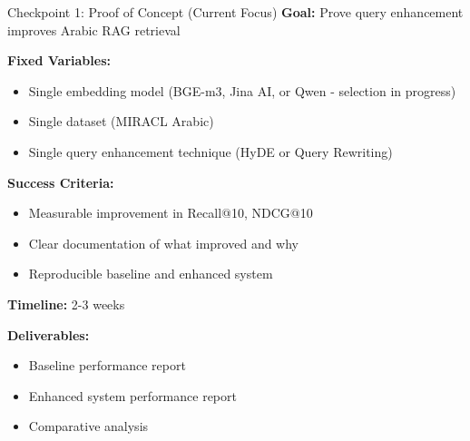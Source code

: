 \documentclass[aspectratio=169]{beamer}
\begin{document}
\begin{frame}{Checkpoint 1: Proof of Concept (Current Focus)}
\textbf{Goal:} Prove query enhancement improves Arabic RAG retrieval

\vspace{0.3cm}

\textbf{Fixed Variables:}
\begin{itemize}
    \item Single embedding model (BGE-m3, Jina AI, or Qwen - selection in progress)
    \item Single dataset (MIRACL Arabic)
    \item Single query enhancement technique (HyDE or Query Rewriting)
\end{itemize}

\vspace{0.3cm}

\textbf{Success Criteria:}
\begin{itemize}
    \item Measurable improvement in Recall@10, NDCG@10
    \item Clear documentation of what improved and why
    \item Reproducible baseline and enhanced system
\end{itemize}

\vspace{0.3cm}

\textbf{Timeline:} 2-3 weeks

\vspace{0.3cm}

\textbf{Deliverables:}
\begin{itemize}
    \item Baseline performance report
    \item Enhanced system performance report
    \item Comparative analysis
\end{itemize}
\end{frame}
\end{document}

